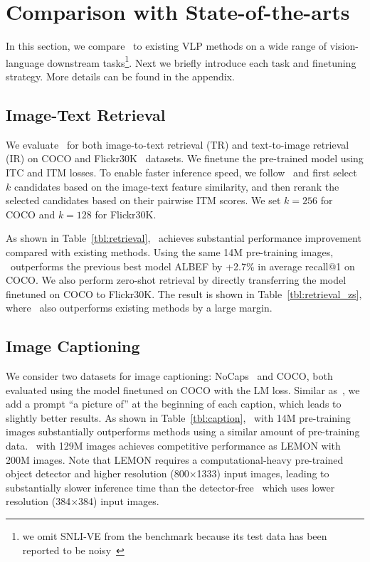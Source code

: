 \vspace{-1.5ex}
\section{Comparison with State-of-the-arts}
\label{sec:downstream}
\vspace{-0.5ex}




In this section,
we compare \name~to existing VLP methods on a wide range of vision-language downstream tasks\footnote{we omit SNLI-VE from the benchmark because its test data has been reported to be noisy~\cite{ve-2.0}}.
Next we briefly introduce each task and finetuning strategy.
More details can be found in the appendix.

\vspace{-1ex}
\subsection{Image-Text Retrieval}
\vspace{-0.5ex}
We evaluate \name~for both image-to-text retrieval (TR) and text-to-image retrieval (IR) on COCO and Flickr30K~\cite{flickr} datasets.
We finetune the pre-trained model using ITC and ITM losses.
To enable faster inference speed, we follow~\citet{ALBEF} and first select $k$ candidates based on the image-text feature similarity,
and then rerank the selected candidates based on their pairwise ITM scores.
We set $k=256$ for COCO and $k=128$ for Flickr30K.

As shown in Table~\ref{tbl:retrieval},
\name~achieves substantial performance improvement compared with existing methods.
Using the same 14M pre-training images,
\name~outperforms the previous best model ALBEF by +2.7\% in average recall@1 on COCO.
We also perform zero-shot retrieval by directly transferring the model finetuned on COCO to Flickr30K.
The result is shown in Table~\ref{tbl:retrieval_zs},
where \name~also outperforms existing methods by a large margin.

\vspace{-1ex}
\subsection{Image Captioning}
\vspace{-0.5ex}

We consider two datasets for image captioning: NoCaps~\cite{nocaps} and COCO,
both evaluated using the model finetuned on COCO with the LM loss.
Similar as~\citet{simvlm},
we add a prompt ``a picture of'' at the beginning of each caption,
which leads to slightly better results.
As shown in Table~\ref{tbl:caption},
\name~with 14M pre-training images substantially outperforms methods using a similar amount of pre-training data.
\name~with 129M images achieves competitive performance as LEMON with 200M images.
Note that LEMON requires a computational-heavy pre-trained object detector and higher resolution (800$\times$1333) input images,
leading to substantially slower inference time than the detector-free \name~which uses lower resolution (384$\times$384) input images.

